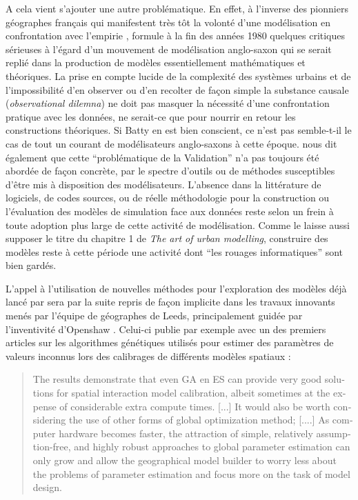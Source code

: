 A cela vient s'ajouter une autre problématique. En effet, à l'inverse des pionniers géographes français qui manifestent très tôt la volonté d'une modélisation en confrontation avec l'empirie \autocites{Pumain1983,AMORAL1983}, \textcite{Openshaw1989} formule à la fin des années 1980 quelques critiques sérieuses à l'égard d'un mouvement de modélisation anglo-saxon qui se serait replié dans la production de modèles essentiellement mathématiques et théoriques. La prise en compte lucide de la complexité des systèmes urbains et de l'impossibilité d'en observer ou d'en recolter de façon simple la substance causale (\textit{observational dilemna}) ne doit pas masquer la nécessité d'une confrontation pratique avec les données, ne serait-ce que pour nourrir en retour les constructions théoriques. Si Batty en est bien conscient, ce n'est pas semble-t-il le cas de tout un courant de modélisateurs anglo-saxons à cette époque. \textcite{Openshaw1989} nous dit également que cette \enquote{problématique de la Validation} n'a pas toujours été abordée de façon concrète, par le spectre d'outils ou de méthodes susceptibles d'être mis à disposition des modélisateurs. L'absence dans la littérature de logiciels, de codes sources, ou de réelle méthodologie pour la construction ou l'évaluation des modèles de simulation face aux données reste selon \textcite{Openshaw1989} un frein à toute adoption plus large de cette activité de modélisation. Comme le laisse aussi supposer le titre du chapitre 1 de \textcite{Batty1976} \textit{The art of urban modelling}, construire des modèles reste à cette période une activité dont \enquote{les rouages informatiques} sont bien gardés. %

L'appel à l'utilisation de nouvelles méthodes pour l'exploration des modèles déjà lancé par \textcite{Batty1976} sera par la suite repris de façon implicite dans les travaux innovants menés par l'équipe de géographes de Leeds, principalement guidée par l'inventivité d'Openshaw \autocites{Openshaw1983, Openshaw1988, Diplock1996, Turton1998}. Celui-ci publie par exemple avec \textcite{Diplock1996} un des premiers articles sur les algorithmes génétiques utilisés pour estimer des paramètres de valeurs inconnus lors des calibrages de différents modèles spatiaux :

\foreignblockquote{english}[\cite{Diplock1996}]{The results demonstrate that even GA en ES can provide very good solutions for spatial interaction model calibration, albeit sometimes at the expense of considerable extra compute times. [...] It would also be worth considering the use of other forms of global optimization method; [....] As computer hardware becomes faster, the attraction of simple, relatively assumption-free, and highly robust approaches to global parameter estimation can only grow and allow the geographical model builder to worry less about the problems of parameter estimation and focus more on the task of model design.}

